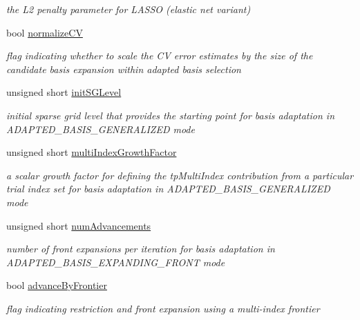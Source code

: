 \begin{DoxyCompactItemize}
\begin{DoxyCompactList}\small\item\em the L2 penalty parameter for L\+A\+S\+SO (elastic net variant) \end{DoxyCompactList}\item 
bool \hyperlink{classPecos_1_1RegressionConfigOptions_ab63ee1bf81e8165cb29a2cbc08731264}{normalize\+CV}\label{classPecos_1_1RegressionConfigOptions_ab63ee1bf81e8165cb29a2cbc08731264}

\begin{DoxyCompactList}\small\item\em flag indicating whether to scale the CV error estimates by the size of the candidate basis expansion within adapted basis selection \end{DoxyCompactList}\item 
unsigned short \hyperlink{classPecos_1_1RegressionConfigOptions_af305a2000b4ce11833f574c8bb2915c1}{init\+S\+G\+Level}\label{classPecos_1_1RegressionConfigOptions_af305a2000b4ce11833f574c8bb2915c1}

\begin{DoxyCompactList}\small\item\em initial sparse grid level that provides the starting point for basis adaptation in A\+D\+A\+P\+T\+E\+D\+\_\+\+B\+A\+S\+I\+S\+\_\+\+G\+E\+N\+E\+R\+A\+L\+I\+Z\+ED mode \end{DoxyCompactList}\item 
unsigned short \hyperlink{classPecos_1_1RegressionConfigOptions_aad280c2e9cb5470be87abb9d76939d6b}{multi\+Index\+Growth\+Factor}\label{classPecos_1_1RegressionConfigOptions_aad280c2e9cb5470be87abb9d76939d6b}

\begin{DoxyCompactList}\small\item\em a scalar growth factor for defining the tp\+Multi\+Index contribution from a particular trial index set for basis adaptation in A\+D\+A\+P\+T\+E\+D\+\_\+\+B\+A\+S\+I\+S\+\_\+\+G\+E\+N\+E\+R\+A\+L\+I\+Z\+ED mode \end{DoxyCompactList}\item 
unsigned short \hyperlink{classPecos_1_1RegressionConfigOptions_a7d67fa925ce6ba8e6e772b2fc0047862}{num\+Advancements}\label{classPecos_1_1RegressionConfigOptions_a7d67fa925ce6ba8e6e772b2fc0047862}

\begin{DoxyCompactList}\small\item\em number of front expansions per iteration for basis adaptation in A\+D\+A\+P\+T\+E\+D\+\_\+\+B\+A\+S\+I\+S\+\_\+\+E\+X\+P\+A\+N\+D\+I\+N\+G\+\_\+\+F\+R\+O\+NT mode \end{DoxyCompactList}\item 
bool \hyperlink{classPecos_1_1RegressionConfigOptions_a1b02775f3f1fe2fc66366285325491ea}{advance\+By\+Frontier}
\begin{DoxyCompactList}\small\item\em flag indicating restriction and front expansion using a multi-\/index frontier \end{DoxyCompactList}\end{DoxyCompactItemize}



